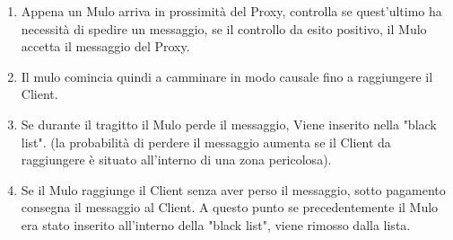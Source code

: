 \documentclass[13pt,a4paper]{article}
\begin{document}
\begin{enumerate}
	\item Appena un Mulo arriva in prossimità del Proxy, controlla se quest'ultimo ha necessità di spedire un messaggio, se il controllo da esito positivo, il Mulo accetta il messaggio del Proxy.
	\item Il mulo comincia quindi a camminare in modo causale fino a raggiungere il Client.
	\item Se durante il tragitto il Mulo perde il messaggio, Viene inserito nella "black list". (la probabilità di perdere il messaggio aumenta se il Client da raggiungere è situato all'interno di una zona pericolosa).
	\item Se il Mulo raggiunge il Client senza aver perso il messaggio, sotto pagamento consegna il messaggio al Client. A questo punto se precedentemente il Mulo era stato inserito all'interno della "black list", viene rimosso dalla lista.
\end{enumerate}
\end{document}
